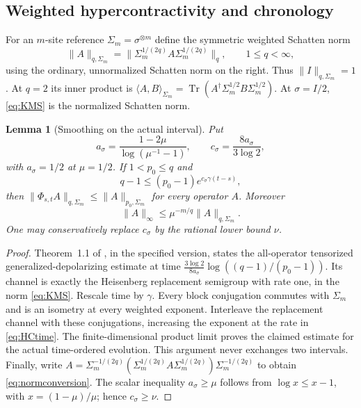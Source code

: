 \documentclass[11pt,reqno]{amsart}
\numberwithin{equation}{section}
\newtheorem{lemma}[theorem]{Lemma}
\theoremstyle{definition}
\theoremstyle{remark}
\newcommand{\Tr}{\operatorname{Tr}}
\newcommand{\nn}[1]{\lVert#1\rVert}
\newcommand{\ip}[2]{\langle#1,#2\rangle}
\begin{document}
\subsection{Weighted hypercontractivity and chronology}
For an $m$-site reference $\Sigma_m=\sigma^{\otimes m}$ define the symmetric weighted Schatten norm
\begin{equation}\label{eq:KMS}
 \nn{A}_{q,\Sigma_m}
 =\nn{\Sigma_m^{1/(2q)}A\Sigma_m^{1/(2q)}}_q,
 \qquad1\leq q<\infty,
\end{equation}
using the ordinary, unnormalized Schatten norm on the right. Thus $\nn{I}_{q,\Sigma_m}=1$. At $q=2$ its inner product is
$\ip AB_{\Sigma_m}=\Tr(A^\dagger\Sigma_m^{1/2}B\Sigma_m^{1/2})$. At $\sigma=I/2$, \eqref{eq:KMS} is the normalized Schatten norm.

\begin{lemma}[Smoothing on the actual interval]\label{lem:HC}
Put
\[
 a_\sigma=\frac{1-2\mu}{\log(\mu^{-1}-1)},\qquad
 c_\sigma=\frac{8a_\sigma}{3\log2},
\]
with $a_\sigma=1/2$ at $\mu=1/2$. If $1<p_0\leq q$ and
\begin{equation}\label{eq:HCtime}
 q-1\leq(p_0-1)e^{c_\sigma\gamma(t-s)},
\end{equation}
then $\nn{\Phi_{s,t}A}_{q,\Sigma_m}\leq\nn{A}_{p_0,\Sigma_m}$ for every operator $A$. Moreover
\begin{equation}\label{eq:normconversion}
 \nn{A}_\infty\leq\mu^{-m/q}\nn{A}_{q,\Sigma_m}.
\end{equation}
One may conservatively replace $c_\sigma$ by the rational lower bound $\nu$.
\end{lemma}
\begin{proof}
Theorem~1.1 of \cite{DGOYZ}, in the specified version, states the all-operator tensorized generalized-depolarizing estimate at time
$\frac{3\log2}{8a_\sigma}\log((q-1)/(p_0-1))$. Its channel is exactly the Heisenberg replacement semigroup with rate one, in the norm \eqref{eq:KMS}. Rescale time by $\gamma$. Every block conjugation commutes with $\Sigma_m$ and is an isometry at every weighted exponent. Interleave the replacement channel with these conjugations, increasing the exponent at the rate in \eqref{eq:HCtime}. The finite-dimensional product limit proves the claimed estimate for the actual time-ordered evolution. This argument never exchanges two intervals. Finally, write $A=\Sigma_m^{-1/(2q)}(\Sigma_m^{1/(2q)}A\Sigma_m^{1/(2q)})\Sigma_m^{-1/(2q)}$ to obtain \eqref{eq:normconversion}. The scalar inequality $a_\sigma\geq\mu$ follows from $\log x\leq x-1$, with $x=(1-\mu)/\mu$; hence $c_\sigma\geq\nu$.
\end{proof}
\end{document}
